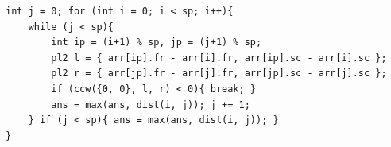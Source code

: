 \begin{verbatim}
int j = 0; for (int i = 0; i < sp; i++){
	while (j < sp){
		int ip = (i+1) % sp, jp = (j+1) % sp;
		pl2 l = { arr[ip].fr - arr[i].fr, arr[ip].sc - arr[i].sc };
		pl2 r = { arr[jp].fr - arr[j].fr, arr[jp].sc - arr[j].sc };
		if (ccw({0, 0}, l, r) < 0){ break; }
		ans = max(ans, dist(i, j)); j += 1;
	} if (j < sp){ ans = max(ans, dist(i, j)); }
}
\end{verbatim}